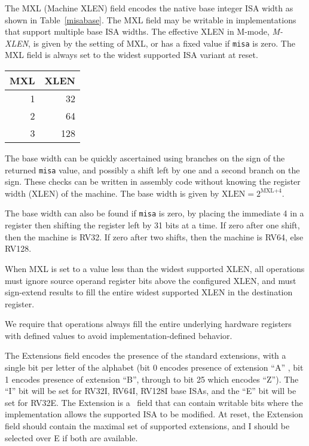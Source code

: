 The MXL (Machine XLEN) field encodes the native base integer ISA width
as shown in Table~\ref{misabase}.  The MXL field may be writable in
implementations that support multiple base ISA widths.  The effective
XLEN in M-mode, {\em M-XLEN}, is given by the setting of MXL, or has a
fixed value if {\tt misa} is zero.  The MXL field is always set to the
widest supported ISA variant at reset.

\begin{table*}[h!]
\begin{center}
\begin{tabular}{|r|r|}
\hline
MXL  & XLEN \\
\hline	 
1   & 32 \\
2   & 64 \\
3   & 128 \\
\hline
\end{tabular}
\end{center}
\caption{Encoding of MXL field in {\tt misa}}
\label{misabase}
\end{table*}

\begin{commentary}
The base width can be quickly ascertained using branches on the sign
of the returned {\tt misa} value, and possibly a shift left by one and
a second branch on the sign.  These checks can be written in assembly
code without knowing the register width (XLEN) of the machine.  The
base width is given by $\mbox{XLEN}=2^{\mbox{MXL+4}}$.

The base width can also be found if {\tt misa} is zero, by placing the
immediate 4 in a register then shifting the register left by 31 bits
at a time.  If zero after one shift, then the machine is RV32.  If
zero after two shifts, then the machine is RV64, else RV128.
\end{commentary}

When MXL is set to a value less than the widest supported XLEN, all
operations must ignore source operand register bits above the
configured XLEN, and must sign-extend results to fill the entire
widest supported XLEN in the destination register.

\begin{commentary}
We require that operations always fill the entire underlying hardware
registers with defined values to avoid implementation-defined
behavior.
\end{commentary}

The Extensions field encodes the presence of the standard extensions,
with a single bit per letter of the alphabet (bit 0 encodes presence
of extension ``A'' , bit 1 encodes presence of extension ``B'',
through to bit 25 which encodes ``Z'').  The ``I'' bit will be set for
RV32I, RV64I, RV128I base ISAs, and the ``E'' bit will be set for
RV32E.  The Extension is a \warl\ field that can contain writable bits
where the implementation allows the supported ISA to be modified.  At
reset, the Extension field should contain the maximal set of supported
extensions, and I should be selected over E if both are available.


